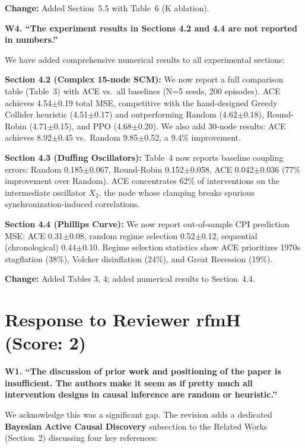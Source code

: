 \documentclass[11pt]{article}
\newcommand{\reviewer}[1]{\vspace{0.8em}\noindent\textbf{\textcolor{reviewercolor}{#1}}}
\newcommand{\response}{\vspace{0.3em}\noindent\textcolor{responsecolor}}
\newcommand{\change}[1]{\textcolor{changecolor}{\textbf{Change:} #1}}
\begin{document}
\change{Added Section~5.5 with Table~6 (K ablation).}

\reviewer{W4. ``The experiment results in Sections 4.2 and 4.4 are not reported in numbers.''}

\response We have added comprehensive numerical results to all experimental sections:

\textbf{Section 4.2 (Complex 15-node SCM):} We now report a full comparison table (Table~3) with ACE vs.\ all baselines (N=5 seeds, 200 episodes). ACE achieves 4.54$\pm$0.19 total MSE, competitive with the hand-designed Greedy Collider heuristic (4.51$\pm$0.17) and outperforming Random (4.62$\pm$0.18), Round-Robin (4.71$\pm$0.15), and PPO (4.68$\pm$0.20). We also add 30-node results: ACE achieves 8.92$\pm$0.45 vs.\ Random 9.85$\pm$0.52, a 9.4\% improvement.

\textbf{Section 4.3 (Duffing Oscillators):} Table~4 now reports baseline coupling errors: Random 0.185$\pm$0.067, Round-Robin 0.152$\pm$0.058, ACE 0.042$\pm$0.036 (77\% improvement over Random). ACE concentrates 62\% of interventions on the intermediate oscillator $X_2$, the node whose clamping breaks spurious synchronization-induced correlations.

\textbf{Section 4.4 (Phillips Curve):} We now report out-of-sample CPI prediction MSE: ACE 0.31$\pm$0.08, random regime selection 0.52$\pm$0.12, sequential (chronological) 0.44$\pm$0.10. Regime selection statistics show ACE prioritizes 1970s stagflation (38\%), Volcker disinflation (24\%), and Great Recession (19\%).

\change{Added Tables 3, 4; added numerical results to Section~4.4.}

\section{Response to Reviewer rfmH (Score: 2)}

\reviewer{W1. ``The discussion of prior work and positioning of the paper is insufficient. The authors make it seem as if pretty much all intervention designs in causal inference are random or heuristic.''}

\response We acknowledge this was a significant gap. The revision adds a dedicated \textbf{Bayesian Active Causal Discovery} subsection to the Related Works (Section~2) discussing four key references:
\end{document}
